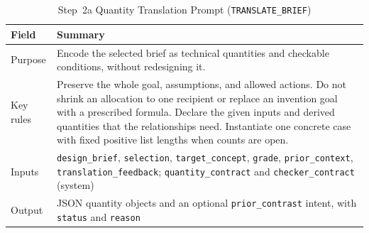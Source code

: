 \begin{table}[!htb]
\centering
\caption[Step 2a Quantity Translation Prompt (\texttt{TRANSLATE\_BRIEF})]{Step~2a Quantity Translation Prompt (\texttt{TRANSLATE\_BRIEF})}
\label{tab:app-structpf-2a-translate}
\footnotesize
\setlength{\tabcolsep}{4.5pt}
\renewcommand{\arraystretch}{1.16}
\begin{tabular}{@{} >{\raggedright\arraybackslash}p{} >{\raggedright\arraybackslash}p{} @{}}
\toprule
\textbf{Field} & \textbf{Summary} \\
\midrule
Purpose & Encode the selected brief as technical quantities and checkable conditions, without redesigning it. \\
Key rules & Preserve the whole goal, assumptions, and allowed actions. \newline Do not shrink an allocation to one recipient or replace an invention goal with a prescribed formula. \newline Declare the given inputs and derived quantities that the relationships need. \newline Instantiate one concrete case with fixed positive list lengths when counts are open. \\
Inputs & \texttt{design\_brief}, \texttt{selection}, \texttt{target\_concept}, \texttt{grade}, \texttt{prior\_context}, \texttt{translation\_feedback}; \texttt{quantity\_contract} and \texttt{checker\_contract} (system) \\
Output & JSON quantity objects and an optional \texttt{prior\_contrast} intent, with \texttt{status} and \texttt{reason} \\
\bottomrule
\end{tabular}
\end{table}

